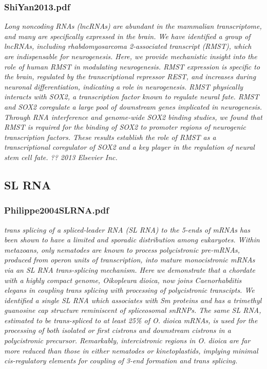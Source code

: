 \subsubsection{ShiYan2013.pdf}
\cite{Bogu2013}
\textit{Long noncoding RNAs (lncRNAs) are abundant in the mammalian transcriptome, and many are specifically expressed in the brain. We have identified a group of lncRNAs, including rhabdomyosarcoma 2-associated transcript (RMST), which are indispensable for neurogenesis. Here, we provide mechanistic insight into the role of human RMST in modulating neurogenesis. RMST expression is specific to the brain, regulated by the transcriptional repressor REST, and increases during neuronal differentiation, indicating a role in neurogenesis. RMST physically interacts with SOX2, a transcription factor known to regulate neural fate. RMST and SOX2 coregulate a large pool of downstream genes implicated in neurogenesis. Through RNA interference and genome-wide SOX2 binding studies, we found that RMST is required for the binding of SOX2 to promoter regions of neurogenic transcription factors. These results establish the role of RMST as a transcriptional coregulator of SOX2 and a key player in the regulation of neural stem cell fate. ?? 2013 Elsevier Inc.}

\subsection{SL RNA}
\subsubsection{Philippe2004SLRNA.pdf}
\cite{Ganot2004}
\textit{trans splicing of a spliced-leader RNA (SL RNA) to the 5-ends of mRNAs has been shown to have a limited
and sporadic distribution among eukaryotes. Within metazoans, only nematodes are known to process polycistronic
pre-mRNAs, produced from operon units of transcription, into mature monocistronic mRNAs via an
SL RNA trans-splicing mechanism. Here we demonstrate that a chordate with a highly compact genome,
Oikopleura dioica, now joins Caenorhabditis elegans in coupling trans splicing with processing of polycistronic
transcipts. We identified a single SL RNA which associates with Sm proteins and has a trimethyl guanosine
cap structure reminiscent of spliceosomal snRNPs. The same SL RNA, estimated to be trans-spliced to at least
25\% of O. dioica mRNAs, is used for the processing of both isolated or first cistrons and downstream cistrons
in a polycistronic precursor. Remarkably, intercistronic regions in O. dioica are far more reduced than those
in either nematodes or kinetoplastids, implying minimal cis-regulatory elements for coupling of 3-end formation
and trans splicing.}


